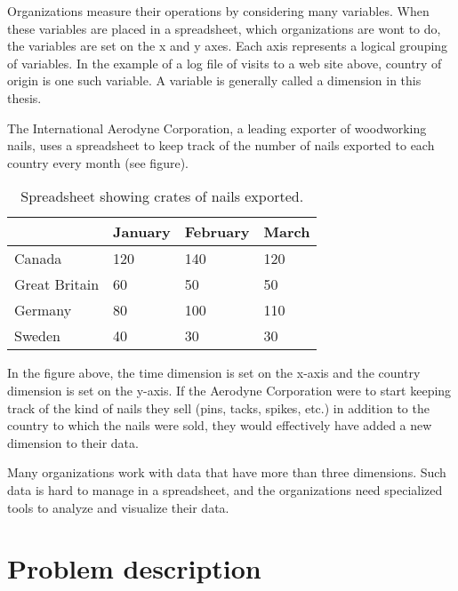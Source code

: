 
Organizations measure their operations by considering many variables. When
these variables are placed in a spreadsheet, which organizations are wont to
do, the variables are set on the x and y axes. Each axis represents a logical
grouping of variables. In the example of a log file of visits to a web site
above, country of origin is one such variable. A variable is generally called
a dimension in this thesis.

The International Aerodyne Corporation, a leading exporter of woodworking
nails, uses a spreadsheet to keep track of the number of nails exported to
each country every month (see figure). 

\begin{table}[h]
    \begin{center}
        \begin{tabular}{|l|l|l|l|}
        \hline
         & January & February & March \\
        \hline
        Canada & 120 & 140 & 120 \\
        \hline
        Great Britain & 60 & 50 & 50 \\
        \hline
        Germany & 80 & 100 & 110 \\
        \hline
        Sweden & 40 & 30 & 30 \\
        \hline
        \end{tabular}
        \caption{Spreadsheet showing crates of nails exported.}
    \end{center}
\end{table}

\vspace{-12pt}

In the figure above, the time dimension is set on the x-axis and the country
dimension is set on the y-axis. If the Aerodyne Corporation were to start
keeping track of the kind of nails they sell (pins, tacks, spikes, etc.) in
addition to the country to which the nails were sold, they would effectively
have added a new dimension to their data.

Many organizations work with data that have more than three dimensions. Such
data is hard to manage in a spreadsheet, and the organizations need
specialized tools to analyze and visualize their data.


\section{Problem description}

